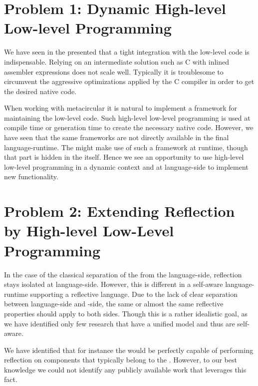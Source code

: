 \section{Problem 1: Dynamic High-level Low-level Programming}
We have seen in the presented \VMs that a tight integration with the low-level code is indispensable.
Relying on an intermediate solution such as C with inlined assembler expressions does not scale well.
Typically it is troublesome to circumvent the aggressive optimizations applied by the C compiler in order to get the desired native code.

When working with metacircular \VMs it is natural to implement a framework for maintaining the low-level code.
Such high-level low-level programming \cite{Fram09a} is used at compile time or \VM generation time to create the necessary native code.
However, we have seen that the same frameworks are not directly available in the final language-runtime.
The \JIT might make use of such a framework at runtime, though that part is hidden in the \VM itself.
Hence we see an opportunity to use high-level low-level programming in a dynamic context and at language-side to implement new functionality.


\section{Problem 2: Extending Reflection by High-level Low-Level Programming}
In the case of the classical separation of the \VM from the language-side, reflection stays isolated at language-side.
However, this is different in a self-aware language-runtime supporting a reflective language.
Due to the lack of clear separation between language-side and \VM-side, the same or almost the same reflective properties should apply to both sides.
Though this is a rather idealistic goal, as we have identified only few research \VMs that have a unified model and thus are self-aware.

We have identified that for instance the \Klein \VM would be perfectly capable of performing reflection on components that typically belong to the \VM.
However, to our best knowledge we could not identify any publicly available work that leverages this fact.

